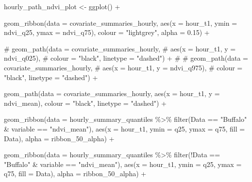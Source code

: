\documentclass[
  letterpaper,
  DIV=11,
  numbers=noendperiod]{scrartcl}
\newenvironment{Shaded}{\begin{snugshade}}{\end{snugshade}}
\newcommand{\AttributeTok}[1]{\textcolor[rgb]{0.40,0.45,0.13}{#1}}
\newcommand{\CommentTok}[1]{\textcolor[rgb]{0.37,0.37,0.37}{#1}}
\newcommand{\FloatTok}[1]{\textcolor[rgb]{0.68,0.00,0.00}{#1}}
\newcommand{\FunctionTok}[1]{\textcolor[rgb]{0.28,0.35,0.67}{#1}}
\newcommand{\NormalTok}[1]{\textcolor[rgb]{0.00,0.23,0.31}{#1}}
\newcommand{\OtherTok}[1]{\textcolor[rgb]{0.00,0.23,0.31}{#1}}
\newcommand{\SpecialCharTok}[1]{\textcolor[rgb]{0.37,0.37,0.37}{#1}}
\newcommand{\StringTok}[1]{\textcolor[rgb]{0.13,0.47,0.30}{#1}}
\begin{document}
\begin{Shaded}
\begin{Highlighting}[]
\NormalTok{hourly\_path\_ndvi\_plot }\OtherTok{\textless{}{-}} \FunctionTok{ggplot}\NormalTok{() }\SpecialCharTok{+}
  
  \FunctionTok{geom\_ribbon}\NormalTok{(}\AttributeTok{data =}\NormalTok{ covariate\_summaries\_hourly,}
              \FunctionTok{aes}\NormalTok{(}\AttributeTok{x =}\NormalTok{ hour\_t1, }\AttributeTok{ymin =}\NormalTok{ ndvi\_q25, }\AttributeTok{ymax =}\NormalTok{ ndvi\_q75),}
              \AttributeTok{colour =} \StringTok{"lightgrey"}\NormalTok{, }\AttributeTok{alpha =} \FloatTok{0.15}\NormalTok{) }\SpecialCharTok{+}
  
  \CommentTok{\# geom\_path(data = covariate\_summaries\_hourly,}
  \CommentTok{\#           aes(x = hour\_t1, y = ndvi\_q025),}
  \CommentTok{\#           colour = "black", linetype = "dashed") +}
  \CommentTok{\# }
  \CommentTok{\# geom\_path(data = covariate\_summaries\_hourly,}
  \CommentTok{\#           aes(x = hour\_t1, y = ndvi\_q975),}
  \CommentTok{\#           colour = "black", linetype = "dashed") +}

  \FunctionTok{geom\_path}\NormalTok{(}\AttributeTok{data =}\NormalTok{ covariate\_summaries\_hourly,}
            \FunctionTok{aes}\NormalTok{(}\AttributeTok{x =}\NormalTok{ hour\_t1, }\AttributeTok{y =}\NormalTok{ ndvi\_mean),}
            \AttributeTok{colour =} \StringTok{"black"}\NormalTok{, }\AttributeTok{linetype =} \StringTok{"dashed"}\NormalTok{) }\SpecialCharTok{+}

  \FunctionTok{geom\_ribbon}\NormalTok{(}\AttributeTok{data =}\NormalTok{ hourly\_summary\_quantiles }\SpecialCharTok{\%\textgreater{}\%} 
                \FunctionTok{filter}\NormalTok{(Data }\SpecialCharTok{==} \StringTok{"Buffalo"} \SpecialCharTok{\&}\NormalTok{ variable }\SpecialCharTok{==} \StringTok{"ndvi\_mean"}\NormalTok{),}
              \FunctionTok{aes}\NormalTok{(}\AttributeTok{x =}\NormalTok{ hour\_t1, }\AttributeTok{ymin =}\NormalTok{ q25, }\AttributeTok{ymax =}\NormalTok{ q75, }\AttributeTok{fill =}\NormalTok{ Data),}
              \AttributeTok{alpha =}\NormalTok{ ribbon\_50\_alpha) }\SpecialCharTok{+}

  \FunctionTok{geom\_ribbon}\NormalTok{(}\AttributeTok{data =}\NormalTok{ hourly\_summary\_quantiles }\SpecialCharTok{\%\textgreater{}\%} 
                \FunctionTok{filter}\NormalTok{(}\SpecialCharTok{!}\NormalTok{Data }\SpecialCharTok{==} \StringTok{"Buffalo"} \SpecialCharTok{\&}\NormalTok{ variable }\SpecialCharTok{==} \StringTok{"ndvi\_mean"}\NormalTok{),}
              \FunctionTok{aes}\NormalTok{(}\AttributeTok{x =}\NormalTok{ hour\_t1, }\AttributeTok{ymin =}\NormalTok{ q25, }\AttributeTok{ymax =}\NormalTok{ q75, }\AttributeTok{fill =}\NormalTok{ Data),}
              \AttributeTok{alpha =}\NormalTok{ ribbon\_50\_alpha) }\SpecialCharTok{+}
  

\end{Highlighting}
\end{Shaded}
\end{document}
